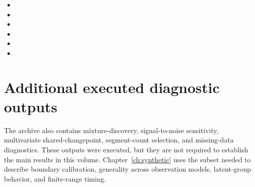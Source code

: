 \begin{itemize}[leftmargin=1.7em,itemsep=2pt]
\item {}
\item {}
\item {}
\item {}
\item {}
\item {}
\end{itemize}

\section{Additional executed diagnostic outputs}
The archive also contains mixture-discovery, signal-to-noise sensitivity, multivariate
shared-changepoint, segment-count selection, and missing-data diagnostics. These outputs were
executed, but they are not required to establish the main results in this volume. Chapter~\ref{ch:synthetic}
uses the subset needed to describe boundary calibration, generality across observation models,
latent-group behavior, and finite-range timing.
